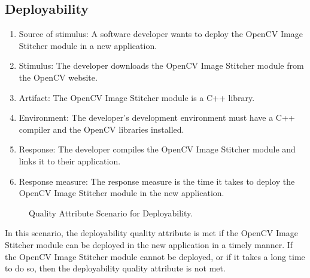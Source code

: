 \subsection{Deployability\label{subSection::DeployabilityQA}}
\begin{enumerate}
    \item Source of stimulus: A software developer wants to deploy the OpenCV Image Stitcher module in a new application.
    \item Stimulus: The developer downloads the OpenCV Image Stitcher module from the OpenCV website.
    \item Artifact: The OpenCV Image Stitcher module is a C++ library.
    \item Environment: The developer's development environment must have a C++ compiler and the OpenCV libraries installed.
    \item Response: The developer compiles the OpenCV Image Stitcher module and links it to their application.
    \item Response measure: The response measure is the time it takes to deploy the OpenCV Image Stitcher module in the new application.
\end{enumerate} 
\begin{figure}[H]
\centering
{}
\caption{\label{Figure::Quality Attribute Scenario for Deployability} Quality Attribute Scenario for Deployability.}
\end{figure}
In this scenario, the deployability quality attribute is met if the OpenCV Image Stitcher module can be deployed in the new application in a timely manner. If the OpenCV Image Stitcher module cannot be deployed, or if it takes a long time to do so, then the deployability quality attribute is not met.
